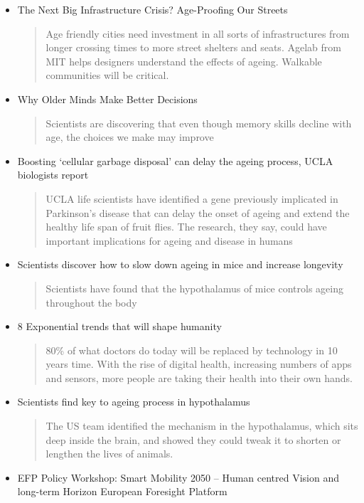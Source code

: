 \begin{itemize}
	\item The Next Big Infrastructure Crisis? Age-Proofing Our Streets
	\begin{quotation}
		Age friendly cities need investment in all sorts of infrastructures from longer crossing times to more street shelters and seats. Agelab from MIT helps designers understand the effects of ageing. Walkable communities will be critical.\end{quotation}
	\item Why Older Minds Make Better Decisions
	\begin{quotation}
		Scientists are discovering that even though memory skills decline with age, the choices we make may improve\end{quotation}
	\item Boosting `cellular garbage disposal' can delay the ageing process, UCLA biologists report
	\begin{quotation}
		UCLA life scientists have identified a gene previously implicated in Parkinson's disease that can delay the onset of ageing and extend the healthy life span of fruit flies. The research, they say, could have important implications for ageing and disease in humans\end{quotation}
	\item Scientists discover how to slow down ageing in mice and increase longevity
	\begin{quotation}
		Scientists have found that the hypothalamus of mice controls ageing throughout the body\end{quotation}
	\item 8 Exponential trends that will shape humanity
	\begin{quotation}
		80\% of what doctors do today will be replaced by technology in 10 years time. With the rise of digital health, increasing numbers of apps and sensors, more people are taking their health into their own hands.\end{quotation}
	\item Scientists find key to ageing process in hypothalamus
	\begin{quotation}
		The US team identified the mechanism in the hypothalamus, which sits deep inside the brain, and showed they could tweak it to shorten or lengthen the lives of animals.\end{quotation}
	\item EFP Policy Workshop: Smart Mobility 2050 -- Human centred Vision and long-term Horizon \textregistered European Foresight Platform
	\begin{quotation}

\end{quotation}
\end{itemize}
